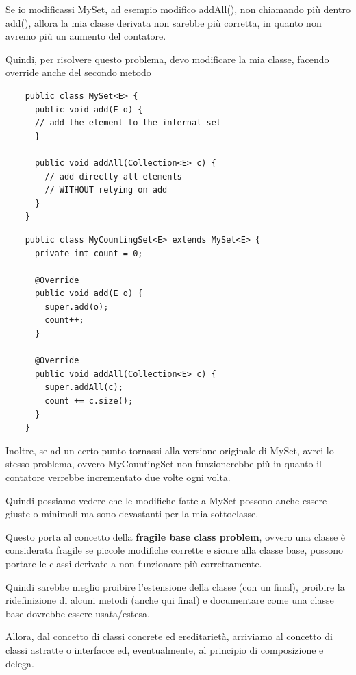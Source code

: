 \newpage
Se io modificassi MySet, ad esempio modifico addAll(), non chiamando più dentro add(), allora la mia classe derivata non sarebbe più corretta, in quanto non avremo più un aumento del contatore.

Quindi, per risolvere questo problema, devo modificare la mia classe, facendo override anche del secondo metodo

\begin{multicols}{2}
  \begin{lstlisting}
    public class MySet<E> {
      public void add(E o) {
      // add the element to the internal set
      }

      public void addAll(Collection<E> c) {
        // add directly all elements
        // WITHOUT relying on add
      }
    }
  \end{lstlisting}
  \columnbreak
  \begin{lstlisting}
    public class MyCountingSet<E> extends MySet<E> {
      private int count = 0;
      
      @Override
      public void add(E o) {
        super.add(o);
        count++;
      }

      @Override
      public void addAll(Collection<E> c) {
        super.addAll(c);
        count += c.size();
      }
    } 
  \end{lstlisting}
\end{multicols}

Inoltre, se ad un certo punto tornassi alla versione originale di MySet, avrei lo stesso problema, ovvero MyCountingSet non funzionerebbe più in quanto il contatore verrebbe incrementato due 
volte ogni volta.

Quindi possiamo vedere che le modifiche fatte a MySet possono anche essere giuste o minimali ma sono devastanti per la mia sottoclasse.

Questo porta al concetto della \textbf{fragile base class problem}, ovvero una classe è considerata fragile se piccole modifiche corrette e sicure alla classe base, possono portare le classi 
derivate a non funzionare più correttamente.

Quindi sarebbe meglio proibire l'estensione della classe (con un final), proibire la ridefinizione di alcuni metodi (anche qui final) e documentare come una classe base dovrebbe essere usata/estesa.

Allora, dal concetto di classi concrete ed ereditarietà, arriviamo al concetto di classi astratte o interfacce ed, eventualmente, al principio di composizione e delega.

